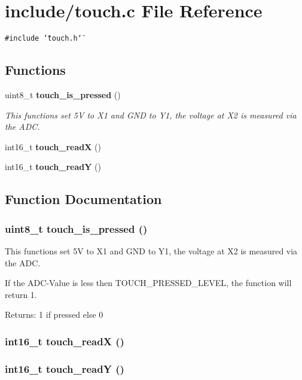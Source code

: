 \section{include/touch.c File Reference}
\label{touch_8c}
{\tt \#include \char`\"{}touch.h\char`\"{}}\par
\subsection*{Functions}
\begin{CompactItemize}
\item 
uint8\_\-t {\bf touch\_\-is\_\-pressed} ()
\begin{CompactList}\small\item\em This functions set 5V to X1 and GND to Y1, the voltage at X2 is measured via the ADC. \item\end{CompactList}\item 
int16\_\-t {\bf touch\_\-readX} ()
\item 
int16\_\-t {\bf touch\_\-readY} ()
\end{CompactItemize}


\subsection{Function Documentation}
\subsubsection{\setlength{\rightskip}{0pt plus 5cm}uint8\_\-t touch\_\-is\_\-pressed ()}\label{touch_8c_215947ded979abf11d490536508ecafc}


This functions set 5V to X1 and GND to Y1, the voltage at X2 is measured via the ADC. 

If the ADC-Value is less then TOUCH\_\-PRESSED\_\-LEVEL, the function will return 1. \begin{Desc}
\item[Returns:]1 if pressed else 0 \end{Desc}
\subsubsection{\setlength{\rightskip}{0pt plus 5cm}int16\_\-t touch\_\-readX ()}\label{touch_8c_dbea78d45cc89e43f7510ebf6eb01ac0}


\subsubsection{\setlength{\rightskip}{0pt plus 5cm}int16\_\-t touch\_\-readY ()}\label{touch_8c_cdce8a6997f2d00dbfcb61be2e67e886}


